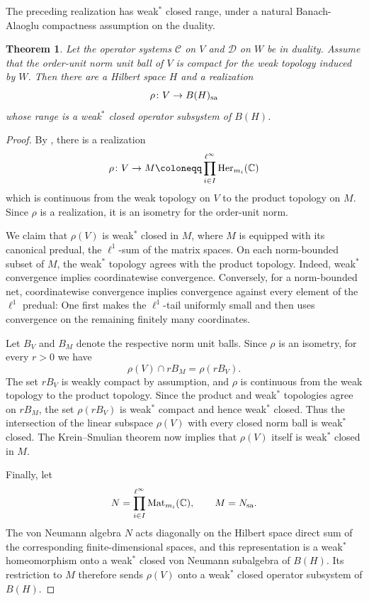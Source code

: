 \documentclass[11pt,onecolumn]{article}
\theoremstyle{plain}
\newtheorem{theorem}{Theorem}[section]
\theoremstyle{definition}
\begin{document}
The preceding realization has weak$^*$ closed range, under a natural Banach-Alaoglu compactness
assumption on the duality.

\begin{theorem}
\label{thm:weakstarreal}
    Let the operator systems $\mathcal C$ on $V$ and $\mathcal D$ on $W$ be in
    duality.  Assume that the order-unit norm unit ball of $V$ is compact for
    the weak topology induced by $W$.  Then there are a Hilbert space $H$ and
    a realization
    \[
        \rho\colon V\to B(H)_{\rm sa}
    \]
    whose range is a weak$^*$ closed operator subsystem of $B(H)$.
\end{theorem}

\begin{proof}
    By , there is a realization
    \[
        \rho\colon V\to
        M\coloneqq\prod_{i\in I}^{\ell^\infty}{\rm Her}_{m_i}(\mathbb C)
    \]
    which is continuous from the weak topology on $V$ to the product topology
    on $M$.  Since $\rho$ is a realization, it is an
    isometry for the order-unit norm.

    We claim that $\rho(V)$ is weak$^*$ closed in $M$, where $M$ is equipped
    with its canonical predual, the $\ell^1$-sum of the matrix spaces.  On
    each norm-bounded subset of $M$, the weak$^*$ topology agrees with the
    product topology.  Indeed, weak$^*$ convergence implies coordinatewise
    convergence.  Conversely, for a norm-bounded net, coordinatewise
    convergence implies convergence against every element of the $\ell^1$
    predual: One first makes the $\ell^1$-tail uniformly small and then uses
    convergence on the remaining finitely many coordinates.

    Let $B_V$ and $B_M$ denote the respective norm unit balls.  Since $\rho$
    is an isometry, for every $r>0$ we have
    \[
        \rho(V)\cap rB_M=\rho(rB_V).
    \]
    The set $rB_V$ is weakly compact by assumption, and $\rho$ is continuous
    from the weak topology to the product topology.  Since the product and
    weak$^*$ topologies agree on $rB_M$, the set $\rho(rB_V)$ is weak$^*$
    compact and hence weak$^*$ closed.  Thus the intersection of the linear
    subspace $\rho(V)$ with every closed norm ball is weak$^*$ closed.  The
    Krein--Smulian theorem now implies that $\rho(V)$ itself is weak$^*$
    closed in $M$.

    Finally, let
    \[
        N=\prod_{i\in I}^{\ell^\infty}{\rm Mat}_{m_i}(\mathbb C),
        \qquad M=N_{\rm sa}.
    \]
    The von Neumann algebra $N$ acts diagonally on the Hilbert space direct
    sum of the corresponding finite-dimensional spaces, and this
    representation is a weak$^*$ homeomorphism onto a weak$^*$ closed von
    Neumann subalgebra of $B(H)$.  Its restriction to $M$ therefore sends
    $\rho(V)$ onto a weak$^*$ closed operator subsystem of $B(H)$.
\end{proof}
\end{document}
